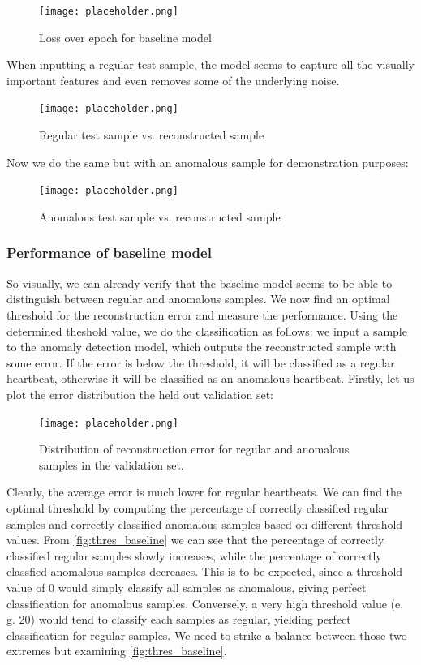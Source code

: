 \begin{figure}[h]
    \centering
    \texttt{[image: placeholder.png]}
    \caption{Loss over epoch for baseline model}
    \label{fig:loss_baseline}
\end{figure}

When inputting a regular test sample, the model seems to capture all the visually important features and even removes some of the underlying noise.

\begin{figure}[h]
    \centering
    \texttt{[image: placeholder.png]}
    \caption{Regular test sample vs. reconstructed sample}
    \label{fig:regog_vs_recon}
\end{figure}

Now we do the same but with an anomalous sample for demonstration purposes:

\begin{figure}[h]
    \centering
    \texttt{[image: placeholder.png]}
    \caption{Anomalous test sample vs. reconstructed sample}
    \label{fig:anomog_vs_recon}
\end{figure}

\subsubsection*{Performance of baseline model}
So visually, we can already verify that the baseline model seems to be able to distinguish between regular and anomalous samples. We now find an optimal threshold for the reconstruction error and measure the performance. Using the determined theshold value, we do the classification as follows: we input a sample to the anomaly detection model, which outputs the reconstructed sample with some error. If the error is below the threshold, it will be classified as a regular heartbeat, otherwise it will be classified as an anomalous heartbeat. Firstly, let us plot the error distribution the held out validation set:

\begin{figure}[h]
    \centering
    \texttt{[image: placeholder.png]}
    \caption{Distribution of reconstruction error for regular and anomalous samples in the validation set.}
    \label{fig:distr_err_baseline}
\end{figure}
Clearly, the average error is much lower for regular heartbeats. We can find the optimal threshold by computing the percentage of correctly classified regular samples and correctly classified anomalous samples based on different threshold values. From \cref{fig:thres_baseline} we can see that the percentage of correctly classified regular samples slowly increases, while the percentage of correctly classfied anomalous samples decreases. This is to be expected, since a threshold value of 0 would simply classify all samples as anomalous, giving perfect classification for anomalous samples. Conversely, a very high threshold value (e. g. 20) would tend to classify each samples as regular, yielding perfect classification for regular samples. We need to strike a balance between those two extremes but examining \cref{fig:thres_baseline}.



